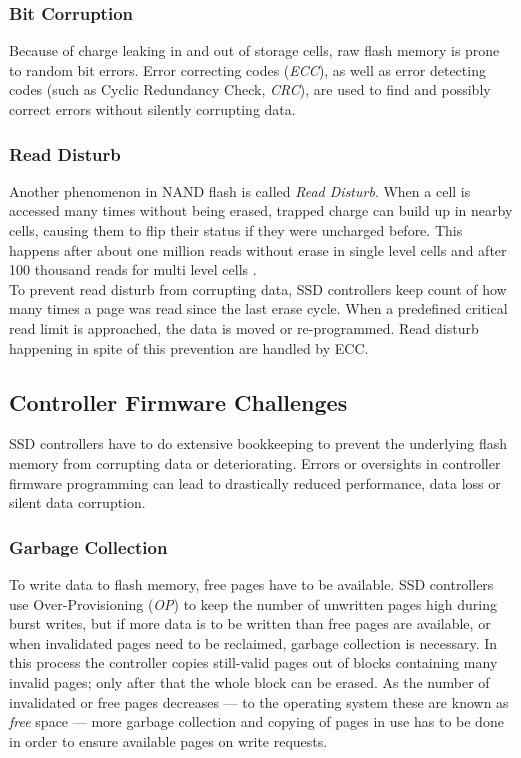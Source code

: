 \documentclass{acm_proc_article-sp}
\begin{document}
\subsubsection*{Bit Corruption}
Because of charge leaking in and out of storage cells, raw flash memory is prone to random bit errors. Error correcting codes (\emph{ECC}), as well as error detecting codes (such as Cyclic Redundancy Check, \emph{CRC}), are used to find and possibly correct errors without silently corrupting data.

\subsubsection*{Read Disturb}
Another phenomenon in NAND flash is called \emph{Read Disturb}. When a cell is accessed many times without being erased, trapped charge can build up in nearby cells, causing them to flip their status if they were uncharged before.
This happens after about one million reads without erase in single level cells and after 100 thousand reads for multi level cells \cite{cooke2007inconvenient}.
\\
To prevent read disturb from corrupting data, SSD controllers keep count of how many times a page was read since the last erase cycle. When a predefined critical read limit is approached, the data is moved or re-programmed. Read disturb happening in spite of this prevention are handled by ECC.

\subsection{Controller Firmware Challenges}
SSD controllers have to do extensive bookkeeping to prevent the underlying flash memory from corrupting data or deteriorating. Errors or oversights in controller firmware programming can lead to drastically reduced performance, data loss or silent data corruption.

\subsubsection*{Garbage Collection}
To write data to flash memory, free pages have to be available. SSD controllers use Over-Provisioning (\emph{OP}) to keep the number of unwritten pages high during burst writes, but if more data is to be written than free pages are available, or when invalidated pages need to be reclaimed, garbage collection is necessary. In this process the controller copies still-valid pages out of blocks containing many invalid pages; only after that the whole block can be erased. As the number of invalidated or free pages decreases --- to the operating system these are known as \emph{free} space --- more garbage collection and copying of pages in use has to be done in order to ensure available pages on write requests.
\end{document}
